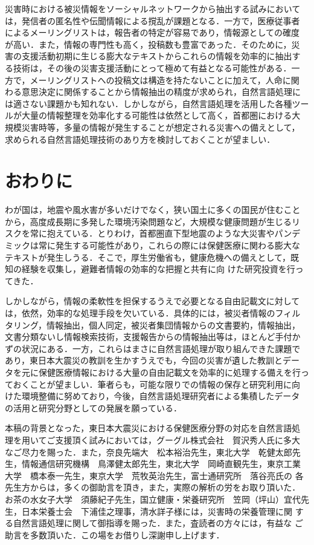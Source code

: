 \documentclass[japanese]{jnlp_1.4}
\begin{document}
災害時における被災情報をソーシャルネットワークから抽出する試みにおいて
は，発信者の匿名性や伝聞情報による撹乱が課題となる．一方で，医療従事者
によるメーリングリストは，報告者の特定が容易であり，情報源としての確度
が高い．また，情報の専門性も高く，投稿数も豊富であった．そのために，災
害の支援活動初期に生じる膨大なテキストからこれらの情報を効率的に抽出す
る技術は，その後の災害支援活動にとって極めて有益となる可能性がある．一
方で，メーリングリストへの投稿文は構造を持たないことに加えて，人命に関
わる意思決定に関係することから情報抽出の精度が求められ，自然言語処理に
は適さない課題かも知れない．しかしながら，自然言語処理を活用した各種ツー
ルが大量の情報整理を効率化する可能性は依然として高く，首都圏における大
規模災害時等，多量の情報が発生することが想定される災害への備えとして，
求められる自然言語処理技術のあり方を検討しておくことが望ましい．


\section{おわりに}

わが国は，地震や風水害が多いだけでなく，狭い国土に多くの国民が住むこと
から，高度成長期に多発した環境汚染問題など，大規模な健康問題が生じるリ
スクを常に抱えている．とりわけ，首都圏直下型地震のような大災害やパンデ
ミックは常に発生する可能性があり，これらの際には保健医療に関わる膨大な
テキストが発生しうる．そこで，厚生労働省も，健康危機への備えとして，既
知の経験を収集し\cite{tanihata2012}，避難者情報の効率的な把握と共有に向
けた研究投資を行ってきた\cite{mizushima2012}．

しかしながら，情報の柔軟性を担保するうえで必要となる自由記載文に対して
は，依然，効率的な処理手段を欠いている．具体的には，被災者情報のフィル
タリング，情報抽出，個人同定，被災者集団情報からの文書要約，情報抽出，
文書分類ないし情報検索技術，支援報告からの情報抽出等は，ほとんど手付か
ずの状況にある．一方，これらはまさに自然言語処理が取り組んできた課題で
あり，東日本大震災の教訓を生かすうえでも，今回の災害が遺した教訓とデー
タを元に保健医療情報における大量の自由記載文を効率的に処理する備えを行っ
ておくことが望ましい．筆者らも，可能な限りでの情報の保存と研究利用に向
けた環境整備に努めており，今後，自然言語処理研究者による集積したデータ
の活用と研究分野としての発展を願っている．


\acknowledgment

本稿の背景となった，東日本大震災における保健医療分野の対応を自然言語処
理を用いてご支援頂く試みにおいては，グーグル株式会社　賀沢秀人氏に多大
なご尽力を賜った．また，奈良先端大　松本裕治先生，東北大学　乾健太郎先
生，情報通信研究機構　鳥澤健太郎先生，東北大学　岡崎直観先生，東京工業
大学　橋本泰一先生，東京大学　荒牧英治先生，富士通研究所　落谷亮氏の
各先生方からは，多くの御助言を頂き，また，実際の解析の労をお取り頂いた．
お茶の水女子大学　須藤紀子先生，国立健康・栄養研究所　笠岡（坪山）宜代先
生，日本栄養士会　下浦佳之理事，清水詳子様には，災害時の栄養管理に関
する自然言語処理に関して御指導を賜った．また，査読者の方々には，有益な
ご助言を多数頂いた．この場をお借りし深謝申し上げます．
\end{document}
